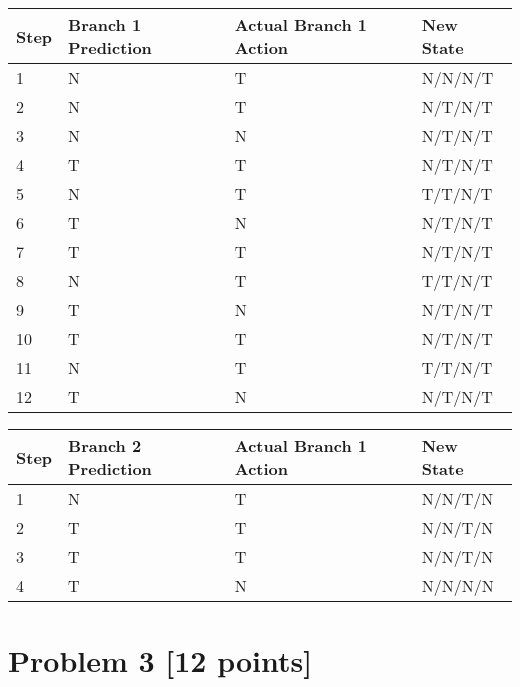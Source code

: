 \documentclass[11pt,leqno]{article}
\begin{document}
\begin{tabular}{|l | l | l | l |}
  \hline
  Step  & Branch 1 Prediction   & Actual Branch 1 Action& New State\\
  \hline
  1     & N                     & T                     & N/N/N/T\\
  \hline
  2     & N                     & T                     & N/T/N/T\\
  \hline
  3     & N                     & N                     & N/T/N/T\\
  \hline
  4     & T                     & T                     & N/T/N/T\\
  \hline
  5     & N                     & T                     & T/T/N/T\\
  \hline
  6     & T                     & N                     & N/T/N/T\\
  \hline
  7     & T                     & T                     & N/T/N/T\\
  \hline
  8     & N                     & T                     & T/T/N/T\\
  \hline
  9     & T                     & N                     & N/T/N/T\\
  \hline
  10    & T                     & T                     & N/T/N/T\\
  \hline
  11    & N                     & T                     & T/T/N/T\\
  \hline
  12    & T                     & N                     & N/T/N/T\\
  \hline
\end{tabular}

\begin{tabular}{|l | l | l | l |}
  \hline
  Step  & Branch 2 Prediction   & Actual Branch 1 Action& New State\\
  \hline
  1     & N                     & T                     & N/N/T/N\\
  \hline
  2     & T                     & T                     & N/N/T/N\\
  \hline
  3     & T                     & T                     & N/N/T/N\\
  \hline
  4     & T                     & N                     & N/N/N/N\\
  \hline
\end{tabular}


\section*{Problem 3 [12 points]}
\end{document}
